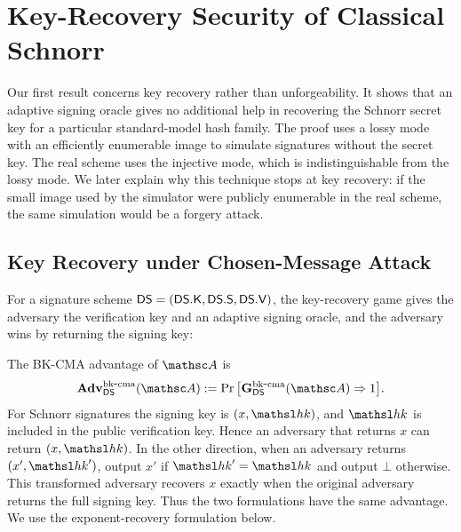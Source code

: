 \section{Key-Recovery Security of Classical Schnorr} \label{sec-lf-kr}

Our first result concerns key recovery rather than unforgeability. It shows that
an adaptive signing oracle gives no additional help in recovering the Schnorr
secret key for a particular standard-model hash family. The proof uses a lossy
mode with an efficiently enumerable image to simulate signatures without the
secret key. The real scheme uses the injective mode, which is indistinguishable
from the lossy mode. We later explain why this technique stops at key recovery:
if the small image used by the simulator were publicly enumerable in the real
scheme, the same simulation would be a forgery attack.

\subsection{Key Recovery under Chosen-Message Attack}

For a signature scheme $\mathsf{DS}=(\mathsf{DS}.\mathsf{K},\mathsf{DS}.\mathsf{S},\mathsf{DS}.\mathsf{V})$, the key-recovery
game gives the adversary the verification key and an adaptive signing oracle,
and the adversary wins by returning the signing key:
\begin{center}
\end{center}
The BK-CMA advantage of $\advA$ is
$$
\AdvBKCMA{\SigScheme}{\advA}
:=
\Pr\big[\gameBKCMA{\SigScheme}(\advA)\Rightarrow1\big].
$$
For Schnorr signatures the signing key is $(x,\hk)$, and $\hk$ is included in
the public verification key. Hence an adversary that returns $x$ can return
$(x,\hk)$. In the other direction, when an adversary returns $(x',\hk')$, output
$x'$ if $\hk'=\hk$ and output $\bot$ otherwise. This transformed adversary
recovers $x$ exactly when the original adversary returns the full signing key.
Thus the two formulations have the same advantage. We use the
exponent-recovery formulation below.

